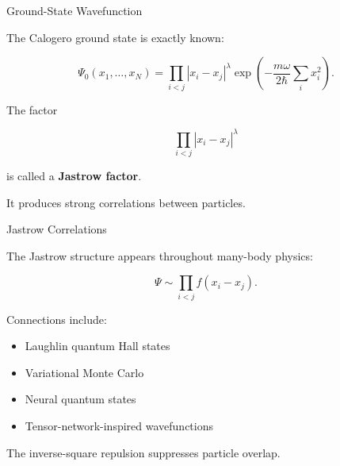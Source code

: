 \documentclass{beamer}
\begin{document}
\begin{frame}{Ground-State Wavefunction}

The Calogero ground state is exactly known:

\[
\Psi_0(x_1,\dots,x_N)
=
\prod_{i<j}
|x_i-x_j|^\lambda
\exp\left(
-\frac{m\omega}{2\hbar}
\sum_i x_i^2
\right).
\]

\vspace{0.4cm}

The factor

\[
\prod_{i<j}|x_i-x_j|^\lambda
\]

is called a \textbf{Jastrow factor}.

\vspace{0.3cm}

It produces strong correlations between particles.

\end{frame}

\begin{frame}{Jastrow Correlations}

The Jastrow structure appears throughout many-body physics:

\[
\Psi \sim
\prod_{i<j}
f(x_i-x_j).
\]

\vspace{0.3cm}

Connections include:

\begin{itemize}
    \item Laughlin quantum Hall states
    \item Variational Monte Carlo
    \item Neural quantum states
    \item Tensor-network-inspired wavefunctions
\end{itemize}

\vspace{0.3cm}

The inverse-square repulsion suppresses particle overlap.

\end{frame}
\end{document}
